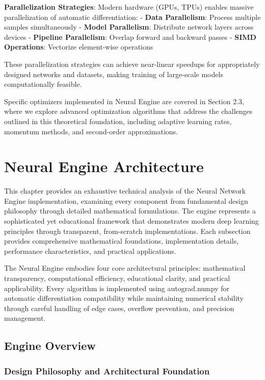 \documentclass[11pt,a4paper]{report}
\begin{document}
\textbf{Parallelization Strategies}: Modern hardware (GPUs, TPUs) enables massive parallelization of automatic differentiation:
- \textbf{Data Parallelism}: Process multiple samples simultaneously
- \textbf{Model Parallelism}: Distribute network layers across devices
- \textbf{Pipeline Parallelism}: Overlap forward and backward passes
- \textbf{SIMD Operations}: Vectorize element-wise operations

These parallelization strategies can achieve near-linear speedups for appropriately designed networks and datasets, making training of large-scale models computationally feasible.

Specific optimizers implemented in Neural Engine are covered in Section 2.3, where we explore advanced optimization algorithms that address the challenges outlined in this theoretical foundation, including adaptive learning rates, momentum methods, and second-order approximations.


\chapter{Neural Engine Architecture}

This chapter provides an exhaustive technical analysis of the Neural Network Engine implementation, examining every component from fundamental design philosophy through detailed mathematical formulations. The engine represents a sophisticated yet educational framework that demonstrates modern deep learning principles through transparent, from-scratch implementations. Each subsection provides comprehensive mathematical foundations, implementation details, performance characteristics, and practical applications.

The Neural Engine embodies four core architectural principles: mathematical transparency, computational efficiency, educational clarity, and practical applicability. Every algorithm is implemented using autograd.numpy for automatic differentiation compatibility while maintaining numerical stability through careful handling of edge cases, overflow prevention, and precision management.

\section{Engine Overview}

\subsection{Design Philosophy and Architectural Foundation}
\end{document}
